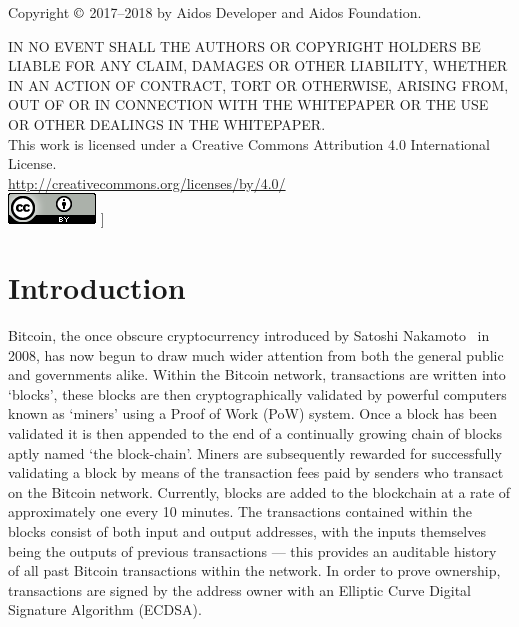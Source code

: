 \documentclass[a4paper,10pt,twocolumn]{article}
\begin{document}
Copyright \( \copyright \)  2017--2018 by Aidos Developer and Aidos Foundation.

IN NO EVENT SHALL THE AUTHORS OR COPYRIGHT HOLDERS BE LIABLE FOR ANY CLAIM, DAMAGES OR OTHER
LIABILITY, WHETHER IN AN ACTION OF CONTRACT, TORT OR OTHERWISE, ARISING FROM,
OUT OF OR IN CONNECTION WITH THE WHITEPAPER OR THE USE OR OTHER DEALINGS IN
THE WHITEPAPER\@.\\

This work is licensed under a Creative Commons Attribution 4.0 International License. \\
\url{http://creativecommons.org/licenses/by/4.0/} \\
\includegraphics{cc}
]

\twocolumn[
\tableofcontents
]

\clearpage

\section{Introduction}
Bitcoin, the once obscure cryptocurrency introduced by Satoshi Nakamoto~\cite{btc} in 2008, has now begun to draw much wider attention 
from both the general public and governments alike. Within the Bitcoin network, transactions are written into `blocks', these blocks are 
then cryptographically validated by powerful computers known as `miners' using a Proof of Work (PoW) system. Once a block has been 
validated it is then appended to the end of a continually growing chain of blocks aptly named `the block-chain'. Miners are subsequently
rewarded for successfully validating a block by means of the transaction fees paid by senders who transact on the Bitcoin network.
Currently, blocks are added to the blockchain at a rate of approximately one every 10 minutes. The transactions contained within the
blocks consist of both input and output addresses, with the inputs themselves being the outputs of previous transactions --- this provides
an auditable history of all past Bitcoin transactions within the network. In order to prove ownership, transactions are signed by the 
address owner with an Elliptic Curve Digital Signature Algorithm (ECDSA).
\end{document}
